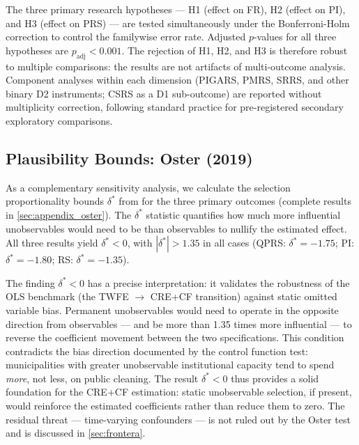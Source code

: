 The three primary research hypotheses --- H1 (effect on FR), H2 (effect on PI), and H3 (effect on PRS) --- are tested simultaneously under the Bonferroni-Holm correction to control the familywise error rate. Adjusted $p$-values for all three hypotheses are $p_{\text{adj}} < 0.001$. The rejection of H1, H2, and H3 is therefore robust to multiple comparisons: the results are not artifacts of multi-outcome analysis. Component analyses within each dimension (PIGARS, PMRS, SRRS, and other binary D2 instruments; CSRS as a D1 sub-outcome) are reported without multiplicity correction, following standard practice for pre-registered secondary exploratory comparisons.

\subsection{Plausibility Bounds: Oster (2019)}
\label{sec:oster_resultados}

As a complementary sensitivity analysis, we calculate the selection proportionality bounds $\delta^*$ from \citet{Oster2019} for the three primary outcomes (complete results in \cref{sec:appendix_oster}).
The $\delta^*$ statistic quantifies how much more influential unobservables would need to be than observables to nullify the estimated effect.
All three results yield $\delta^* < 0$, with $|\delta^*| > 1.35$ in all cases (QPRS: $\delta^* = -1.75$; PI: $\delta^* = -1.80$; RS: $\delta^* = -1.35$).

The finding $\delta^* < 0$ has a precise interpretation: it validates the robustness of the OLS benchmark (the TWFE $\to$ CRE+CF transition) against static omitted variable bias.
Permanent unobservables would need to operate in the opposite direction from observables --- and be more than 1.35 times more influential --- to reverse the coefficient movement between the two specifications.
This condition contradicts the bias direction documented by the control function test: municipalities with greater unobservable institutional capacity tend to spend \textit{more}, not less, on public cleaning.
The result $\delta^* < 0$ thus provides a solid foundation for the CRE+CF estimation: static unobservable selection, if present, would reinforce the estimated coefficients rather than reduce them to zero.
The residual threat --- time-varying confounders --- is not ruled out by the Oster test and is discussed in \cref{sec:frontera}.
